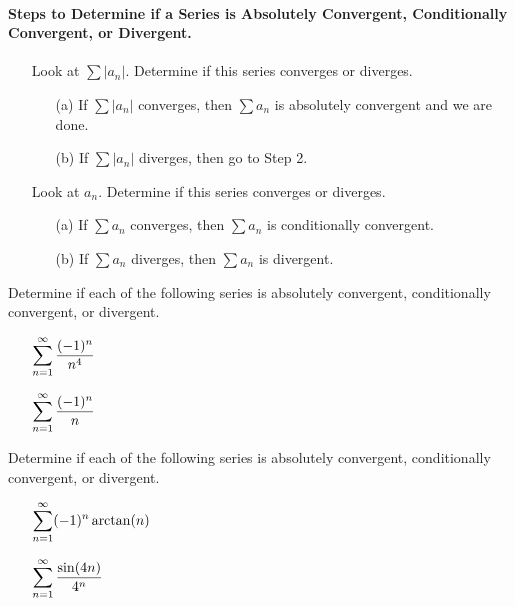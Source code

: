 \documentclass[12pt]{article}
\begin{document}
\paragraph{Steps to Determine if a Series is Absolutely Convergent, Conditionally \\ Convergent, or Divergent.}
\begin{enumerate}
	\item[\tc{1}] Look at $\sum |a_n|$. Determine if this series converges or diverges.
	\begin{itemize}
		\item[(a)] If $\sum |a_n|$ converges, then $\sum a_n$ is absolutely convergent and we are done.
		\item[(b)] If $\sum|a_n|$ diverges, then go to Step 2.
	\end{itemize}
	\item[\tc{2}] Look at $a_n$. Determine if this series converges or diverges.
	\begin{itemize}
		\item[(a)] If $\sum a_n$ converges, then $\sum a_n$ is conditionally convergent.
		\item[(b)] If $\sum a_n$ diverges, then $\sum a_n$ is divergent.
	\end{itemize}
\end{enumerate}

\newpage

\Examples Determine if each of the following series is absolutely convergent, conditionally convergent, or divergent.

\begin{itemize}
\item[\tc{1}] $\displaystyle\sum_{n=1}^\infty \dfrac{(-1)^n}{n^4}$

\vfill

\item[\tc{2}] $\displaystyle\sum_{n=1}^\infty \dfrac{(-1)^n}{n}$

\vfill
\end{itemize}

\newpage

\ExamplesCont Determine if each of the following series is absolutely convergent, conditionally convergent, or divergent.

\begin{itemize}
\item[\tc{3}] $\displaystyle\sum_{n=1}^\infty(-1)^n\arctan(n)$

\vfill

\item[\tc{4}] $\displaystyle\sum_{n=1}^\infty \dfrac{\sin(4n)}{4^n}$

\vfill
\end{itemize}
\end{document}
